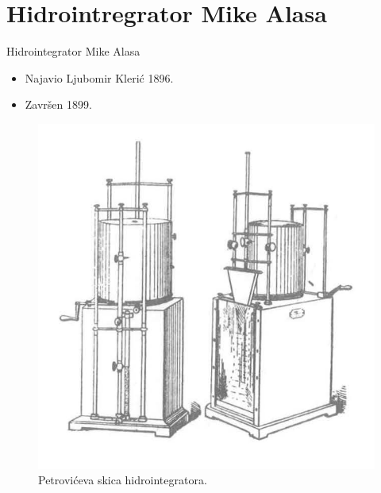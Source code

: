 \documentclass[14pt]{beamer}
\begin{document}
\section{Hidrointregrator Mike Alasa}
\begin{frame}{Hidrointegrator Mike Alasa}
\begin{itemize}
    \item Najavio Ljubomir Klerić 1896.
    \item Završen 1899.
\end{itemize}
\begin{figure}[h!]
\begin{center}
\includegraphics[scale=0.6]{h1.jpg}
\end{center}
\caption{Petrovićeva skica hidrointegratora. }
\label{fig:h1}
\end{figure}
    
\end{frame}
\end{document}
